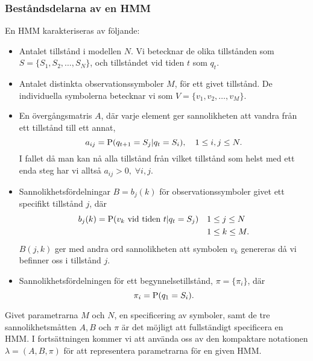 \documentclass[../rapport_MVEX01-11-05]{subfiles}
\begin{document}
\subsubsection{Beståndsdelarna av en HMM}
En HMM karakteriseras av följande:
\begin{itemize}
\item Antalet tillstånd i modellen $N$. Vi betecknar de olika
  tillstånden som $S = \{S_1, S_2, \dots, S_N\}$, och tillståndet vid
  tiden $t$ som $q_t$.
\item Antalet distinkta observationssymboler $M$, för ett givet
  tillstånd. De individuella symbolerna betecknar vi som $V =
  \{v_1,v_2,\dots,v_M\}$.
\item En övergångsmatris $A$, där varje element ger sannolikheten att
  vandra från ett tillstånd till ett annat, 
\begin{equation*}
a_{ij} = \mathrm{P}(q_{t+1} = S_j|q_t = S_i),\quad 1 \leq i,j \leq N.
\end{equation*}
I fallet då man kan nå alla tillstånd från vilket tillstånd som helst
med ett enda steg har vi alltså $a_{ij} > 0,\;\forall i,j$. 
\item Sannolikhetsfördelningar $B = b_j(k)$ för observationssymboler givet ett
  specifikt tillstånd $j$, där 
\begin{align*}
b_j(k) = \mathrm{P}(v_k \text{ vid tiden } t|q_t = S_j) \quad &1 \leq j \leq N\\
&1 \leq k \leq M.
\end{align*}
$B(j,k)$ ger med andra ord sannolikheten att symbolen $v_k$ genereras
då vi befinner oss i tillstånd $j$.
\item Sannolikhetsfördelningen för ett begynnelsetillstånd, $\pi =
  \{\pi_i\}$, där
\begin{equation*}
\pi_i = \mathrm{P}(q_1 = S_i).
\end{equation*}
\end{itemize}
Givet parametrarna $M$ och $N$, en specificering av symboler, samt de
tre sannolikhetsmåtten $A, B$ och $\pi$ är det%
möjligt att
fullständigt specificera en HMM. I fortsättningen kommer vi att
använda oss av den kompaktare notationen $\lambda = (A,B,\pi)$
för att representera parametrarna för en given HMM.
\end{document}
